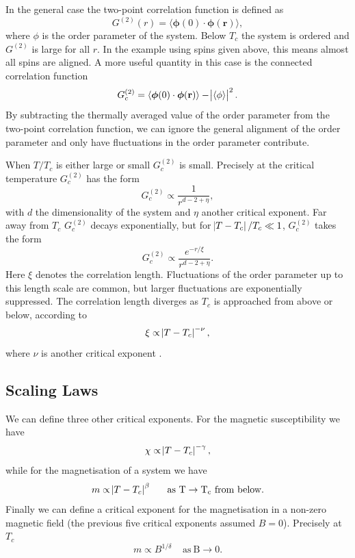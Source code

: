 \documentclass[11pt, a4paper]{report} %
\begin{document}
In the general case the two-point correlation function is defined as
\begin{equation}
	G^{(2)}(r) = \langle \boldsymbol{\phi}(0) \cdot \boldsymbol{\phi}(\mathbf{r}) \rangle,
\end{equation}
where \(\phi\) is the order parameter of the system.
Below \(T_c\) the system is ordered and \(G^{(2)}\) is large for all \(r\).
In the example using spins given above, this means almost all spins are aligned.
A more useful quantity in this case is the connected correlation function
\begin{equation}
	G_c^{(2)} = \langle \boldsymbol{\phi}(0) \cdot \boldsymbol{\phi}(\mathbf{r}) \rangle - \abs{\langle \phi \rangle}^2.
\end{equation}
By subtracting the thermally averaged value of the order parameter from the two-point correlation function, we can ignore the general alignment of the order parameter and only have fluctuations in the order parameter contribute.

When \(T/T_c\) is either large or small \(G_c^{(2)}\) is small.
Precisely at the critical temperature \(G_c^{(2)}\) has the form
\begin{equation}
	G_c^{(2)} \propto \frac{1}{r^{d-2+\eta}},
\end{equation}
with \(d\) the dimensionality of the system and \(\eta\) another critical exponent.
Far away from \(T_c\) \(G_c^{(2)}\) decays exponentially, but for \(\abs{T-T_c} / T_c \ll 1\), \(G_c^{(2)}\) takes the form
\begin{equation}
	G_c^{(2)} \propto \frac{e^{-r/\xi}}{r^{d-2+\eta}}.
\end{equation}
Here \(\xi\) denotes the correlation length.
Fluctuations of the order parameter up to this length scale are common, but larger fluctuations are exponentially suppressed.
The correlation length diverges as \(T_c\) is approached from above or below, according to
\begin{equation}
	\label{eq:correlation_length}
	\xi \propto \abs{T-T_c}^{-\nu},
\end{equation}
where \(\nu\) is another critical exponent \cite{binney:1992}.

\subsection{Scaling Laws}\label{sec:scaling_laws}
We can define three other critical exponents.
For the magnetic susceptibility we have
\begin{equation}
	\label{eq:chi_divergence}
	\chi \propto \abs{T-T_c}^{-\gamma},
\end{equation}
while for the magnetisation of a system we have
\begin{equation}
	\label{eq:magnetization_beta}
	m \propto \abs{T-T_c}^{\beta} \mathrm{\ \ \ \ \ as\ T \to T_c\ from\ below}.
\end{equation}
Finally we can define a critical exponent for the magnetisation in a non-zero magnetic field (the previous five critical exponents assumed \(B=0\)).
Precisely at \(T_c\)
\begin{equation}
	m \propto B^{1/\delta} \mathrm{\ \ \ \ \ as\ B \to 0}.
\end{equation}
\end{document}
